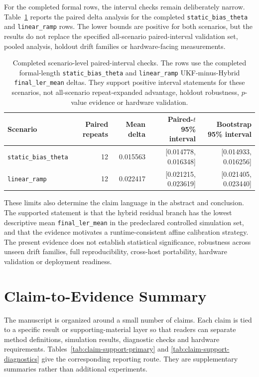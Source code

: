\documentclass[11pt]{article}
\newcommand{\softwarehil}{controlled simulation}
\newcommand{\finalLER}{\texttt{final\_ler\_mean}}
\begin{document}
For the completed formal rows, the interval checks remain deliberately narrow.
Table~\ref{tab:paired-interval-scenarios} reports the paired delta analysis for
the completed \texttt{static\_bias\_theta} and \texttt{linear\_ramp} rows.  The
lower bounds are positive for both scenarios, but the results do not replace
the specified all-scenario paired-interval validation set, pooled analysis, holdout drift
families or hardware-facing measurements.

\begin{table}[htbp]
\centering
\small
\begin{tabular}{@{}lrrrr@{}}
\toprule
Scenario & Paired repeats & Mean delta & Paired-\(t\) 95\% interval & Bootstrap 95\% interval \\
\midrule
\texttt{static\_bias\_theta} & 12 & 0.015563 & [0.014778, 0.016348] & [0.014933, 0.016256] \\
\texttt{linear\_ramp} & 12 & 0.022417 & [0.021215, 0.023619] & [0.021405, 0.023440] \\
\bottomrule
\end{tabular}
\caption{Completed scenario-level paired-interval checks.  The rows use the completed
formal-length \texttt{static\_bias\_theta} and \texttt{linear\_ramp}
UKF-minus-Hybrid \finalLER{} deltas.  They support positive interval
statements for these scenarios, not all-scenario repeat-expanded advantage,
holdout robustness, \(p\)-value evidence or hardware validation.}
\label{tab:paired-interval-scenarios}
\end{table}

These limits also determine the claim language in the abstract and conclusion.
The supported statement is that the hybrid residual branch has the lowest
descriptive mean \finalLER{} in the predeclared \softwarehil{} set, and that the
evidence motivates a runtime-consistent affine calibration strategy.  The
present evidence does not establish statistical significance, robustness across
unseen drift families, full reproducibility, cross-host portability, hardware
validation or deployment readiness.

\section{Claim-to-Evidence Summary}

The manuscript is organized around a small number of claims.  Each claim is tied
to a specific result or supporting-material layer so that readers can separate
method definitions, simulation results, diagnostic checks and hardware
requirements.
Tables~\ref{tab:claim-support-primary} and
\ref{tab:claim-support-diagnostics} give the corresponding reporting route.
They are supplementary summaries rather than additional experiments.
\end{document}
